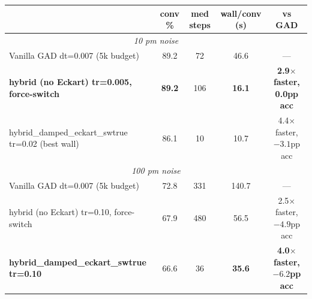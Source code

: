 \documentclass[11pt]{article}
\begin{document}
\begin{center}\small
\begin{tabular}{l|cccc}
\toprule
& \textbf{conv \%} & \textbf{med steps} & \textbf{wall/conv (s)} & \textbf{vs GAD} \\
\midrule
\multicolumn{5}{c}{\textit{10 pm noise}} \\
\midrule
Vanilla GAD dt=0.007 (5k budget)                      & 89.2 & 72  & 46.6 & --- \\
\textbf{hybrid (no Eckart) tr=0.005, force-switch}    & \textbf{89.2} & 106 & \textbf{16.1} & \textbf{2.9$\times$ faster, 0.0pp acc} \\
hybrid\_damped\_eckart\_swtrue tr=0.02 (best wall)    & 86.1 & 10  & 10.7 & 4.4$\times$ faster, $-3.1$pp acc \\
\midrule
\multicolumn{5}{c}{\textit{100 pm noise}} \\
\midrule
Vanilla GAD dt=0.007 (5k budget)                      & 72.8 & 331 & 140.7 & --- \\
hybrid (no Eckart) tr=0.10, force-switch              & 67.9 & 480 & 56.5 & 2.5$\times$ faster, $-4.9$pp acc \\
\textbf{hybrid\_damped\_eckart\_swtrue tr=0.10}        & 66.6 & 36  & \textbf{35.6} & \textbf{4.0$\times$ faster, $-6.2$pp acc} \\
\bottomrule
\end{tabular}
\end{center}
\end{document}
